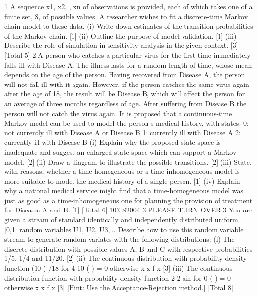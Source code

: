 \documentclass[a4paper,12pt]{article}
\begin{document}
\begin{enumerate}

1 A sequence x1, x2, , xn of observations is provided, each of which takes one of a
finite set, S, of possible values. A researcher wishes to fit a discrete-time Markov
chain model to these data.
(i) Write down estimates of the transition probabilities of the Markov chain. [1]
(ii) Outline the purpose of model validation. [1]
(iii) Describe the role of simulation in sensitivity analysis in the given context. [3]
[Total 5]
2 A person who catches a particular virus for the first time immediately falls ill with
Disease A. The illness lasts for a random length of time, whose mean depends on the
age of the person. Having recovered from Disease A, the person will not fall ill with it
again. However, if the person catches the same virus again after the age of 18, the
result will be Disease B, which will affect the person for an average of three months
regardless of age. After suffering from Disease B the person will not catch the virus
again.
It is proposed that a continuous-time Markov model can be used to model the person s
medical history, with states:
0: not currently ill with Disease A or Disease B
1: currently ill with Disease A
2: currently ill with Disease B
(i) Explain why the proposed state space is inadequate and suggest an enlarged
state space which can support a Markov model. [2]
(ii) Draw a diagram to illustrate the possible transitions. [2]
(iii) State, with reasons, whether a time-homogeneous or a time-inhomogeneous
model is more suitable to model the medical history of a single person. [1]
(iv) Explain why a national medical service might find that a time-homogeneous
model was just as good as a time-inhomogeneous one for planning the
provision of treatment for Diseases A and B. [1]
[Total 6]
103 S2004 3 PLEASE TURN OVER%
3 You are given a stream of standard identically and independently distributed uniform
[0,1] random variables U1, U2, U3, ..
Describe how to use this random variable stream to generate random variates with the
following distributions:
(i) The discrete distribution with possible values A, B and C with respective
probabilities 1/5, 1/4 and 11/20. [2]
(ii) The continuous distribution with probability density function
(10 ) /18 for 4 10
( ) =
0 otherwise
x x
f x [3]
(iii) The continuous distribution function with probability density function
2 2
sin for 0
( ) =
0 otherwise
x x
f x [3]
[Hint: Use the Acceptance-Rejection method.]
[Total 8]
\end{enumerate}
\end{document}
